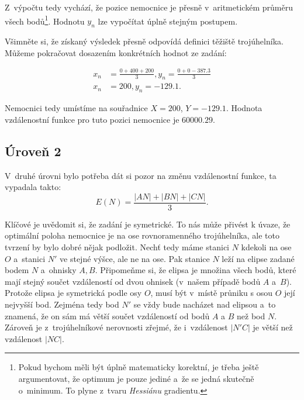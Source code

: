 \documentclass[12pt,a4paper]{article}
\begin{document}
Z~výpočtu tedy vychází, že pozice nemocnice je přesně v~aritmetickém průměru
všech bodů\footnote{Pokud bychom měli být úplně matematicky korektní, je třeba
ještě argumentovat, že optimum je pouze jediné a~že se jedná skutečně o~minimum.
To plyne z~tvaru \textit{Hessiánu} gradientu.}. Hodnotu $y_n$ lze vypočítat
úplně stejným postupem.

Všimněte si, že získaný výsledek přesně odpovídá definici těžiště trojúhelníka.
Můžeme pokračovat dosazením konkrétních hodnot ze zadání:

\begin{align}
x_n &= \frac{0 + 400 + 200}{3}, y_n = \frac{0 + 0 - 387.3}{3} \nonumber \\
x_n &= 200, y_n = -129.1  \nonumber.
\end{align}

Nemocnici tedy umístíme na souřadnice $X=200$, $Y=-129.1$. Hodnota vzdálenostní
funkce pro tuto pozici nemocnice je $60000.29$.

\subsection*{Úroveň 2}
V~druhé úrovni bylo potřeba dát si pozor na změnu vzdálenostní funkce, ta vypadala takto:
$$E(N) = \frac{|AN| + |BN| + |CN|}{3}.$$

Klíčové je uvědomit si, že zadání je symetrické. To nás může přivést k úvaze, že optimální poloha nemocnice je na ose rovnoramenného trojúhelníka,
ale toto tvrzení by bylo dobré nějak podložit. Nechť tedy máme stanici $N$ kdekoli na ose $O$ a~stanici $N'$ ve stejné výšce, ale ne na ose. Pak stanice $N$ leží na elipse zadané bodem $N$ a~ohnisky $A,B$.
Připomeňme si, že elipsa je množina všech bodů, které mají stejný součet vzdáleností od dvou ohnisek (v~našem případě bodů $A$ a~$B$). Protože elipsa je symetrická podle osy $O$,
musí být v~místě průniku s osou $O$ její nejvyšší bod. Zejména tedy bod $N'$ se vždy bude nacházet nad elipsou a~to znamená, že on sám má větší součet vzdáleností od bodů $A$ a $B$ než bod $N$.
Zároveň je z~trojúhelníkové nerovnosti zřejmé, že i~vzdálenost $|N'C|$ je větší než vzdálenost $|NC|$.
\end{document}
